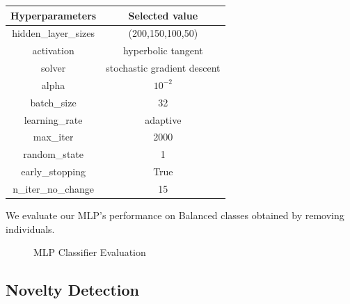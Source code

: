 \begin{center}
    \begin{tabular}{|c|c|}
        \hline
        \textbf{Hyperparameters} & \textbf{Selected value} \\ \hline
        hidden\_layer\_sizes & (200,150,100,50) \\ \hline
        activation  & hyperbolic tangent \\ \hline
        solver & stochastic gradient descent \\ \hline
        alpha & \(10^{-2}\)  \\ \hline
        batch\_size & 32 \\ \hline
        learning\_rate & adaptive \\ \hline
        max\_iter & 2000 \\ \hline
        random\_state & 1 \\ \hline
        early\_stopping & True \\ \hline
        n\_iter\_no\_change & 15\\ \hline
    \end{tabular}
\end{center}

We evaluate our MLP's performance on Balanced classes obtained by removing individuals.

\begin{figure}
    \centering
    \qquad
    \caption{MLP Classifier Evaluation}
    \label{mlp}
\end{figure}


\subsection{Novelty Detection}